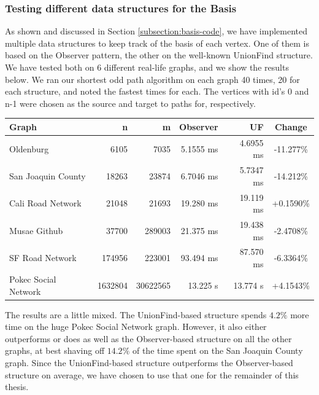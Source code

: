 \subsubsection{Testing different data structures for the Basis}
\label{subsubsection:testing-basis}
As shown and discussed in Section \ref{subsection:basis-code}, we have implemented multiple data structures to keep track of the basis of each vertex. One of them is based on the Observer pattern, the other on the well-known UnionFind structure. We have tested both on 6 different real-life graphs, and we show the results below. We ran our shortest odd path algorithm on each graph 40 times, 20 for each structure, and noted the fastest times for each. The vertices with id's 0 and n-1 were chosen as the source and target to paths for, respectively. 
\begin{center}
    \begin{tabular}{|l | r | r | r | r | c|} 
     \hline
     Graph & n & m & Observer & UF & Change \\ [0.5ex] 
     \hline\hline
     Oldenburg & 6105 & 7035 & 5.1555 ms & 4.6955 ms & -11.277\%\\ 
     \hline
     San Joaquin County & 18263 & 23874 & 6.7046 ms & 5.7347 ms & -14.212\%\\
     \hline
     Cali Road Network & 21048 & 21693 & 19.280 ms & 19.119 ms & +0.1590\%\\
     \hline
     Musae Github \cite{graph:musae-github} & 37700 & 289003 & 21.375 ms & 19.438 ms & -2.4708\%\\
     \hline
     SF Road Network & 174956 & 223001 & 93.494 ms & 87.570 ms & -6.3364\%\\ [1ex] 
     \hline
     Pokec Social Network \cite{graph:soc-pokec} & 1632804 & 30622565 & 13.225 s & 13.774 s & +4.1543\%\\ [1ex] 
     \hline
    \end{tabular}
\end{center}


The results are a little mixed. The UnionFind-based structure spends $4.2\%$ more time on the huge Pokec Social Network graph. However, it also either outperforms or does as well as the Observer-based structure on all the other graphs, at best shaving off $14.2\%$ of the time spent on the San Joaquin County graph. Since the UnionFind-based structure outperforms the Observer-based structure on average, we have chosen to use that one for the remainder of this thesis.

